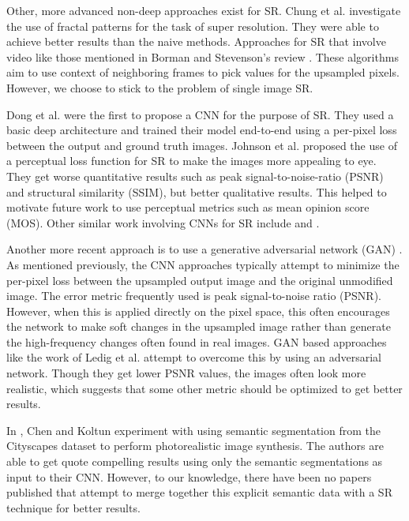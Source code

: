 \documentclass[10pt,twocolumn,letterpaper]{article}
\begin{document}
Other, more advanced non-deep approaches exist for SR. Chung et al.
\cite{FractalSR} investigate the use of fractal patterns for the task of super
resolution. They were able to achieve better results than the naive methods.
Approaches for SR that involve video like those mentioned in Borman and
Stevenson's review \cite{VideoSR}. These algorithms aim to use context of
neighboring frames to pick values for the upsampled pixels. However, we choose
to stick to the problem of single image SR.

Dong et al. \cite{SRCNN} were the first to propose a CNN for the purpose of SR.
They used a basic deep architecture and trained their model end-to-end using a
per-pixel loss between the output and ground truth images. Johnson et al.
\cite{PerceptualLosses} proposed the use of a perceptual loss function for SR
to make the images more appealing to eye. They get worse quantitative results
such as peak signal-to-noise-ratio (PSNR) and structural similarity (SSIM), but
better qualitative results. This helped to motivate future work to use
perceptual metrics such as mean opinion score (MOS). Other similar work
involving CNNs for SR include \cite{RealtimeCNN} and \cite{DeeplyRecursive}.

Another more recent approach is to use a generative adversarial network (GAN)
\cite{GAN}. As mentioned previously, the CNN approaches typically attempt to
minimize the per-pixel loss between the upsampled output image and the original
unmodified image. The error metric frequently used is peak signal-to-noise
ratio (PSNR). However, when this is applied directly on the pixel space, this
often encourages the network to make soft changes in the upsampled image rather
than generate the high-frequency changes often found in real images. GAN based
approaches like the work of Ledig et al. \cite{SRGAN} attempt to overcome this
by using an adversarial network. Though they get lower PSNR values, the images
often look more realistic, which suggests that some other metric should be
optimized to get better results.

In \cite{ImageSynthesis}, Chen and Koltun experiment with using semantic
segmentation from the Cityscapes dataset \cite{Cityscapes} to perform
photorealistic image synthesis. The authors are able to get quote compelling
results using only the semantic segmentations as input to their CNN. However,
to our knowledge, there have been no papers published that attempt to merge
together this explicit semantic data with a SR technique for better results.
\end{document}
